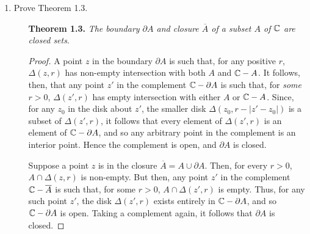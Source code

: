 \documentclass[11pt, a4paper, latinreim, shortsets]{notes}
\begin{document}
\begin{enumerate}[label={\bfseries II.5.\arabic*}]
	\item Prove Theorem 1.3.
		\begin{enumerate}
			\item[\textbf{Theorem 1.3.}] \emph{The boundary $\partial A$ and closure $\overline A$ of a
			subset $A$ of $\mathbb{C}$ are closed sets}.
			\begin{proof}
				A point $z$ in the boundary $\partial A$ is such that, for any positive $r$, $\Delta(z, r)$
				has non-empty intersection with both $A$ and $\mathbb{C} - A$. It follows, then, that any point $z'$
				in the complement $\mathbb{C} - \partial A$ is such that, for \emph{some} $r > 0$, $\Delta(z', r)$
				has empty intersection with either $A$ or $\mathbb{C} - A$. Since, for any $z_0$ in	the disk about $z'$,
				the smaller disk $\Delta(z_0, r-|z'-z_0|)$ is a subset of $\Delta(z',r)$, it follows that every
				element of $\Delta(z', r)$ is an element of $\mathbb{C} - \partial A$, and so any arbitrary point in
				the complement is an interior point. Hence the complement is open, and $\partial A$ is closed.

				Suppose a point $z$ is in the closure $\overline A = A \cup \partial A$. Then, for every $r > 0$,
				$A \cap \Delta(z, r)$ is non-empty. But then, any point $z'$ in the complement $\mathbb{C}-\overline A$
				is such that, for some $r > 0$, $A \cap \Delta(z', r)$ is empty. Thus, for any such point $z'$,
				the disk $\Delta(z',r)$ exists entirely in $\mathbb{C} - \partial A$, and so $\mathbb{C} - \partial A$ is open.
				Taking a complement again, it follows that $\partial A$ is closed.
			\end{proof}
	\end{enumerate}


\end{enumerate}
\end{document}
